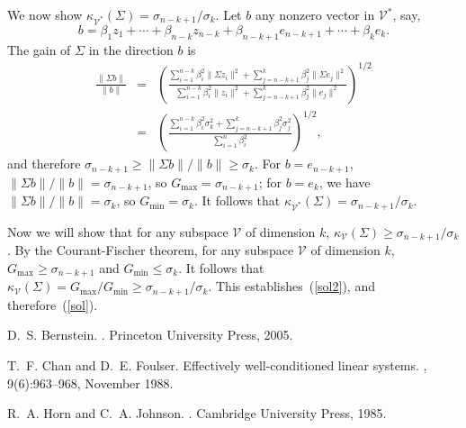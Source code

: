 \documentclass[12pt]{article}
\begin{document}
We now show $\kappa_{\mathcal V^*}(\Sigma) =\sigma_{n-k+1} /
\sigma_k$.
Let $b$ any nonzero vector in $\mathcal V^*$, say, 
\[
b = \beta_1 z_1 +
\cdots + \beta_{n-k} z_{n-k} + \beta_{n-k+1} e_{n-k+1} + \cdots +
\beta_{k} e_{k}.
\]
The gain of $\Sigma$ in the direction $b$ is
\begin{eqnarray*}
\frac{\|\Sigma b\|}{\|b\|}&=&
\left( \frac
{\sum_{i=1}^{n-k}  \beta_i^2 \|\Sigma z_i\|^2 +
\sum_{j=n-k+1}^{k} \beta_j^2 \|\Sigma e_j\|^2}
{\sum_{i=1}^{n-k} \beta_i^2 \|z_i\|^2 +
\sum_{j=n-k+1}^{k} \beta_j^2\|e_j\|^2}
\right) ^{1/2}\\
&=&
\left( \frac
{\sum_{i=1}^{n-k}  \beta_i^2 \sigma_k^2 +
\sum_{j=n-k+1}^{k} \beta_j^2 \sigma_j^2}
{\sum_{i=1}^{n} \beta_i^2}
\right) ^{1/2},
\end{eqnarray*}
and therefore
$\sigma_{n-k+1} \geq \|\Sigma b\|/\|b\| \geq \sigma_{k}$.
For $b = e_{n-k+1}$, $\|\Sigma b\| / \|b\| = \sigma_{n-k+1} $,
so $G_\mathrm{max} =  \sigma_{n-k+1}$;
for $b = e_{k}$, we have $\| \Sigma b\| / \|b\| = \sigma_{k} $,
so $G_\mathrm{min} = \sigma_{k}$.
It follows that $\kappa_{\mathcal V^*}(\Sigma) 
= \sigma_{n-k+1} / \sigma_k$.

Now we will show that for any subspace $\mathcal V$ of dimension
$k$, $\kappa_{\mathcal V} (\Sigma)\geq \sigma_{n-k+1} /
\sigma_k$.
By the Courant-Fischer theorem, for any subspace
$\mathcal{V}$ of dimension $k$, $G_\mathrm{max} \geq
\sigma_{n-k+1}$ and $G_\mathrm{min} \leq \sigma_{k}$.
It follows that
$\kappa_{\mathcal V}(\Sigma) =  G_\mathrm{max}/{G_\mathrm{min}}
\geq \sigma_{n-k+1}/\sigma_k$.
This establishes~(\ref{sol2}), and therefore~(\ref{sol}).


%
\begin{thebibliography}{1}

D.~S. Bernstein.
.
\newblock Princeton University Press, 2005.

T.~F. Chan and D.~E. Foulser.
\newblock Effectively well-conditioned linear systems.
,
  9(6):963--968, November 1988.

R.~A. Horn and C.~A. Johnson.
.
\newblock Cambridge University Press, 1985.

\end{thebibliography}
\end{document}
